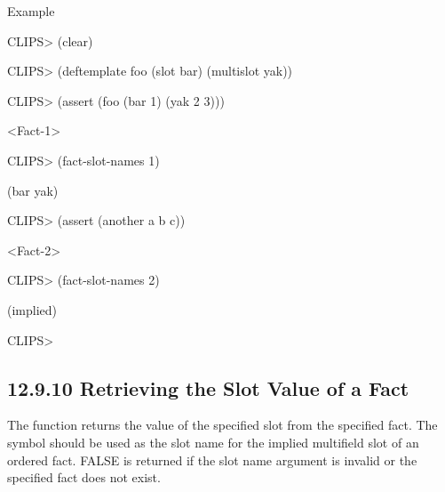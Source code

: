 \documentclass[letterpaper,10pt,english]{sphinxmanual}
\begin{document}

\begin{sphinxVerbatim}[commandchars=\\\{\}]
 
\end{sphinxVerbatim}

Example

CLIPS\textgreater{} (clear)

CLIPS\textgreater{} (deftemplate foo (slot bar) (multislot yak))

CLIPS\textgreater{} (assert (foo (bar 1) (yak 2 3)))

\textless{}Fact-1\textgreater{}

CLIPS\textgreater{} (fact-slot-names 1)

(bar yak)

CLIPS\textgreater{} (assert (another a b c))

\textless{}Fact-2\textgreater{}

CLIPS\textgreater{} (fact-slot-names 2)

(implied)

CLIPS\textgreater{}


\subsection{12.9.10 Retrieving the Slot Value of a Fact}
\label{\detokenize{actions:retrieving-the-slot-value-of-a-fact}}
The  function returns the value of the specified slot
from the specified fact. The symbol  should be used as the slot
name for the implied multifield slot of an ordered fact. FALSE is
returned if the slot name argument is invalid or the specified fact does
not exist.


\begin{sphinxVerbatim}[commandchars=\\\{\}]
  
\end{sphinxVerbatim}
\end{document}
